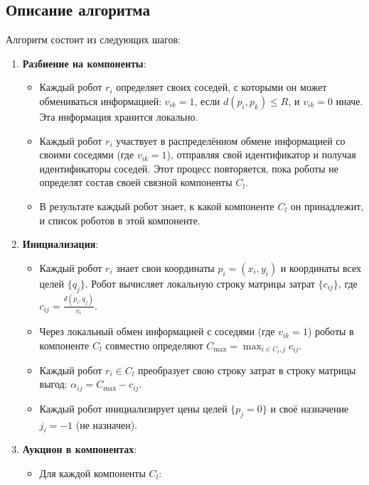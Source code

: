 \subsection{Описание алгоритма}

Алгоритм состоит из следующих шагов:

\begin{enumerate}
    \item \textbf{Разбиение на компоненты}:
    \begin{itemize}
        \item Каждый робот \( r_i \) определяет своих соседей, с которыми он может обмениваться информацией: \( v_{ik} = 1 \), если \( d(p_i, p_k) \leq R \), и \( v_{ik} = 0 \) иначе. Эта информация хранится локально.
        \item Каждый робот \( r_i \) участвует в распределённом обмене информацией со своими соседями (где \( v_{ik} = 1 \)), отправляя свой идентификатор и получая идентификаторы соседей. Этот процесс повторяется, пока роботы не определят состав своей связной компоненты \( C_l \).
        \item В результате каждый робот знает, к какой компоненте \( C_l \) он принадлежит, и список роботов в этой компоненте.
    \end{itemize}
    \item \textbf{Инициализация}:
    \begin{itemize}
        \item Каждый робот \( r_i \) знает свои координаты \( p_i = (x_i, y_i) \) и координаты всех целей \( \{q_j\} \). Робот вычисляет локальную строку матрицы затрат \( \{c_{ij}\} \), где \( c_{ij} = \frac{d(p_i, q_j)}{v_i}\).
        \item Через локальный обмен информацией с соседями (где \( v_{ik} = 1 \)) роботы в компоненте \( C_l \) совместно определяют \( C_{\text{max}} = \max_{i \in C_l, j} c_{ij} \).
        \item Каждый робот \( r_i \in C_l \) преобразует свою строку затрат в строку матрицы выгод: \( \alpha_{ij} = C_{\text{max}} - c_{ij} \).
        \item Каждый робот инициализирует цены целей \( \{p_j = 0\} \) и своё назначение \( j_i = -1 \) (не назначен).
    \end{itemize}
    \item \textbf{Аукцион в компонентах}:
    \begin{itemize}
        \item Для каждой компоненты \( C_l \):
        \begin{enumerate}

\end{enumerate}
\end{itemize}
\end{enumerate}
